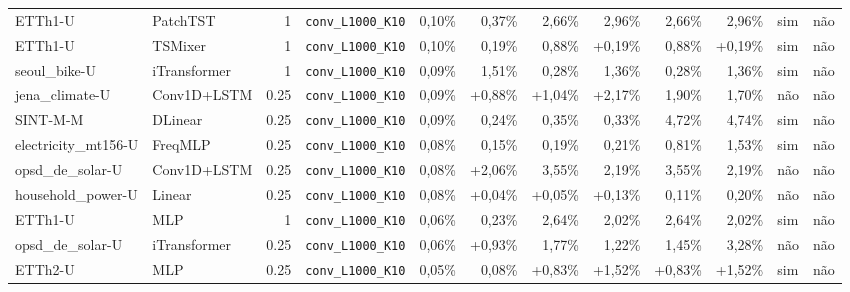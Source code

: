 \begin{longtable}{llrlrrrrrrll}
ETTh1-U & PatchTST & 1 & \texttt{conv\_\allowbreak{}L1000\_\allowbreak{}K10} & \textminus{}0,10\% & \textminus{}0,37\% & \textminus{}2,66\% & \textminus{}2,96\% & \textminus{}2,66\% & \textminus{}2,96\% & sim & n\~ao \\
ETTh1-U & TSMixer & 1 & \texttt{conv\_\allowbreak{}L1000\_\allowbreak{}K10} & \textminus{}0,10\% & \textminus{}0,19\% & \textminus{}0,88\% & +0,19\% & \textminus{}0,88\% & +0,19\% & sim & n\~ao \\
seoul\_bike-U & iTransformer & 1 & \texttt{conv\_\allowbreak{}L1000\_\allowbreak{}K10} & \textminus{}0,09\% & \textminus{}1,51\% & \textminus{}0,28\% & \textminus{}1,36\% & \textminus{}0,28\% & \textminus{}1,36\% & sim & n\~ao \\
jena\_climate-U & Conv1D+LSTM & 0.25 & \texttt{conv\_\allowbreak{}L1000\_\allowbreak{}K10} & \textminus{}0,09\% & +0,88\% & +1,04\% & +2,17\% & \textminus{}1,90\% & \textminus{}1,70\% & n\~ao & n\~ao \\
SINT-M-M & DLinear & 0.25 & \texttt{conv\_\allowbreak{}L1000\_\allowbreak{}K10} & \textminus{}0,09\% & \textminus{}0,24\% & \textminus{}0,35\% & \textminus{}0,33\% & \textminus{}4,72\% & \textminus{}4,74\% & sim & n\~ao \\
electricity\_mt156-U & FreqMLP & 0.25 & \texttt{conv\_\allowbreak{}L1000\_\allowbreak{}K10} & \textminus{}0,08\% & \textminus{}0,15\% & \textminus{}0,19\% & \textminus{}0,21\% & \textminus{}0,81\% & \textminus{}1,53\% & sim & n\~ao \\
opsd\_de\_solar-U & Conv1D+LSTM & 0.25 & \texttt{conv\_\allowbreak{}L1000\_\allowbreak{}K10} & \textminus{}0,08\% & +2,06\% & \textminus{}3,55\% & \textminus{}2,19\% & \textminus{}3,55\% & \textminus{}2,19\% & n\~ao & n\~ao \\
household\_power-U & Linear & 0.25 & \texttt{conv\_\allowbreak{}L1000\_\allowbreak{}K10} & \textminus{}0,08\% & +0,04\% & +0,05\% & +0,13\% & \textminus{}0,11\% & \textminus{}0,20\% & n\~ao & n\~ao \\
ETTh1-U & MLP & 1 & \texttt{conv\_\allowbreak{}L1000\_\allowbreak{}K10} & \textminus{}0,06\% & \textminus{}0,23\% & \textminus{}2,64\% & \textminus{}2,02\% & \textminus{}2,64\% & \textminus{}2,02\% & sim & n\~ao \\
opsd\_de\_solar-U & iTransformer & 0.25 & \texttt{conv\_\allowbreak{}L1000\_\allowbreak{}K10} & \textminus{}0,06\% & +0,93\% & \textminus{}1,77\% & \textminus{}1,22\% & \textminus{}1,45\% & \textminus{}3,28\% & n\~ao & n\~ao \\
ETTh2-U & MLP & 0.25 & \texttt{conv\_\allowbreak{}L1000\_\allowbreak{}K10} & \textminus{}0,05\% & \textminus{}0,08\% & +0,83\% & +1,52\% & +0,83\% & +1,52\% & sim & n\~ao \\

\end{longtable}
